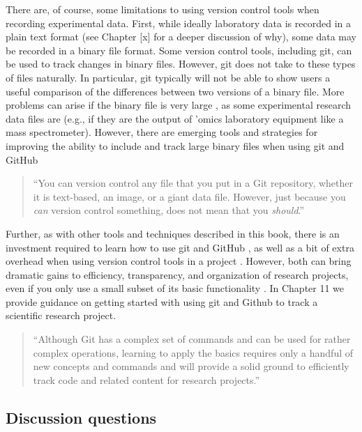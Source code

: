 \documentclass[]{tufte-book}
\begin{document}
There are, of course, some limitations to using version control tools when
recording experimental data. First, while ideally laboratory data is recorded in
a plain text format (see Chapter {[}x{]} for a deeper discussion of why), some data
may be recorded in a binary file format. Some version control tools, including
git, can be used to track changes in binary files. However, git does not take to
these types of files naturally. In particular, git typically will not be able to
show users a useful comparison of the differences between two versions of a
binary file. More problems can arise if the binary file is very large
\citep{perez2016ten, blischak2016quick}, as some experimental research data files
are (e.g., if they are the output of 'omics laboratory equipment like a mass
spectrometer). However, there are emerging tools and strategies for improving
the ability to include and track large binary files when using git and GitHub
\citep{blischak2016quick}

\begin{quote}
``You can version control any file that you put in a Git repository, whether it is
text-based, an image, or a giant data file. However, just because you \emph{can} version
control something, does not mean that you \emph{should}.'' \citep{blischak2016quick}
\end{quote}

Further, as with other tools and techniques described in this book, there is an
investment required to learn how to use git and GitHub \citep{perez2016ten}, as well
as a bit of extra overhead when using version control tools in a project
\citep{raymond2003art}. However, both can bring dramatic gains to efficiency,
transparency, and organization of research projects, even if you only use a
small subset of its basic functionality \citep{perez2016ten}. In Chapter 11 we
provide guidance on getting started with using git and Github to track a
scientific research project.

\begin{quote}
``Although Git has a complex set of commands and can be used for rather complex
operations, learning to apply the basics requires only a handful of new concepts
and commands and will provide a solid ground to efficiently track code and related
content for research projects.'' \citep{perez2016ten}
\end{quote}

\hypertarget{discussion-questions-3}{%
\subsection{Discussion questions}\label{discussion-questions-3}}
\end{document}
